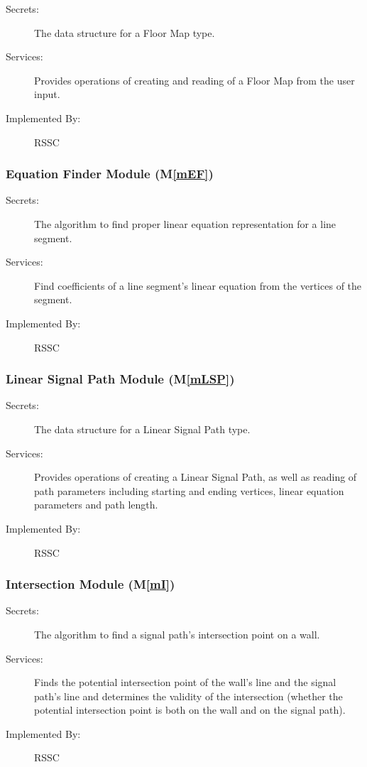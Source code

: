 \documentclass[12pt, titlepage]{article}
\newcommand{\mref}[1]{M\ref{#1}}
\begin{document}
\begin{description}
\item[Secrets:]The data structure for a Floor Map type.
\item[Services:]Provides operations of creating and reading of a Floor Map from the user input.  
\item[Implemented By:] RSSC
\end{description}

\subsubsection{Equation Finder Module (\mref{mEF})}

\begin{description}
\item[Secrets:]The algorithm to find proper linear equation representation for a line segment.
\item[Services:]Find coefficients of a line segment's linear equation from the vertices of the segment.
\item[Implemented By:] RSSC
\end{description}

\subsubsection{Linear Signal Path Module (\mref{mLSP})}

\begin{description}
\item[Secrets:]The data structure for a Linear Signal Path type.
\item[Services:]Provides operations of creating a Linear Signal Path, as well as reading of path parameters including starting and ending vertices, linear equation parameters and path length. 
\item[Implemented By:] RSSC
\end{description}

\subsubsection{Intersection Module (\mref{mI})}

\begin{description}
\item[Secrets:]The algorithm to find a signal path's intersection point on a wall.
\item[Services:]Finds the potential intersection point of the wall's line and the signal path's line and determines the validity of the intersection (whether the potential intersection point is both on the wall and on the signal path).
\item[Implemented By:] RSSC
\end{description}
\end{document}
